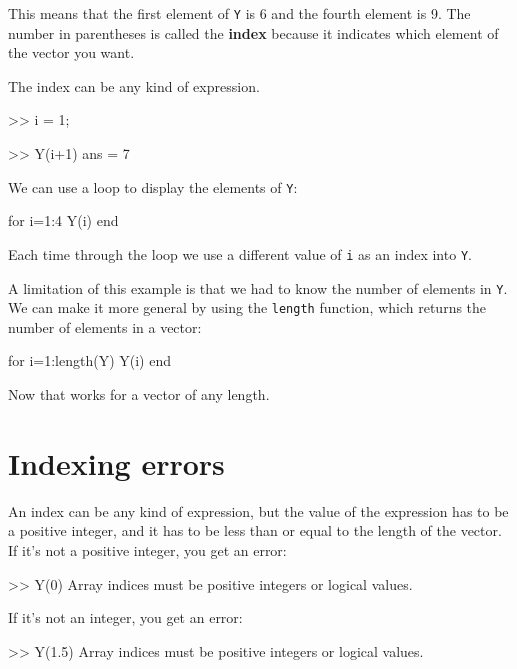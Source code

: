 \documentclass[
]{book}
\numberwithin{Answer}{chapter}
\numberwithin{Exercise}{chapter}
\begin{document}
This means that the first element of {\tt Y} is 6 and the
fourth element is 9.
The number in parentheses is called the {\bf index} because it indicates which element of the vector you want.


The index can be any kind of expression.

\begin{code}
>> i = 1;

>> Y(i+1)
ans = 7
\end{code}

We can use a loop to display the elements of {\tt Y}:


\begin{code}
for i=1:4
     Y(i)
end
\end{code}

Each time through the loop we use a different value of {\tt i}
as an index into {\tt Y}.


A limitation of this example is that we had to know the number
of elements in {\tt Y}.  We can make it more general by using
the {\tt length} function, which returns the number of elements
in a vector:

\begin{code}
for i=1:length(Y)
     Y(i)
end
\end{code}

Now that works for a vector of any length.


\section{Indexing errors}


An index can be any kind of expression, but the value of the
expression has to be a positive integer, and it has to be
less than or equal to the length of the vector.  If it's
not a positive integer, you get an error:

\begin{code}
>> Y(0)
Array indices must be positive integers or logical values.
\end{code}

If it's not an integer, you get an error:

\begin{code}
>> Y(1.5)
Array indices must be positive integers or logical values.
\end{code}
\end{document}
